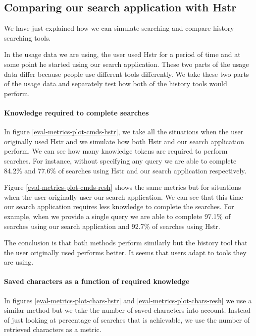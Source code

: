 \subsection{Comparing our search application with Hstr}

We have just explained how we can simulate searching and compare history searching tools.

In the usage data we are using, the user used Hstr for a period of time and at some point he started using our search application. These two parts of the usage data differ because people use different tools differently. We take these two parts of the usage data and separately test how both of the history tools would perform.

\paragraph{Knowledge required to complete searches}

In figure \ref{eval-metrics-plot-cmds-hstr}, we take all the situations when the user originally used Hstr and we simulate how both Hstr and our search application perform.
We can see how many knowledge tokens are required to perform searches. For instance, without specifying any query we are able to complete 84.2\% and 77.6\% of searches using Hstr and our search application respectively. 

Figure \ref{eval-metrics-plot-cmds-resh} shows the same metrics but for situations when the user originally user our search application. We can see that this time our search application requires less knowledge to complete the searches. For example, when we provide a single query we are able to complete 97.1\% of searches using our search application and 92.7\% of searches using Hstr. 

The conclusion is that both methods perform similarly but the history tool that the user originally used performs better. It seems that users adapt to tools they are using.

\paragraph{Saved characters as a function of required knowledge}

In figures \ref{eval-metrics-plot-chars-hstr} and \ref{eval-metrics-plot-chars-resh} we use a similar method but we take the number of saved characters into account. Instead of just looking at percentage of searches that is achievable, we use the number of retrieved characters as a metric. 

